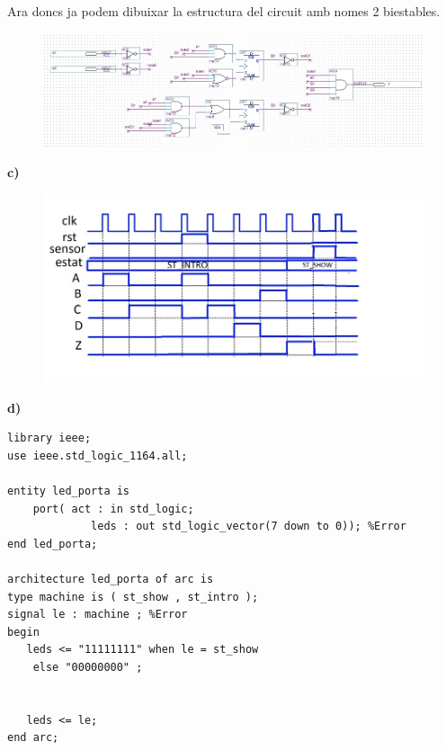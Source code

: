 \documentclass[12pt, a4papre]{article}
\begin{document}
	Ara doncs ja podem dibuixar la estructura del circuit amb nomes 2 biestables.
	
	\begin{figure}[H]
		\begin{center}
		\includegraphics[width=140mm]{DisenyB.jpeg}
		\end{center}
	\end{figure}
	
	\textbf{c)}
	
	\begin{figure}[H]
		\begin{center}
		\includegraphics[width=140mm]{cronogramaC.jpeg}
		\end{center}
	\end{figure}
	
	\textbf{d)}
		\begin{lstlisting}[style=vhdl, frame=single, basicstyle=\small]
library ieee;
use ieee.std_logic_1164.all;

entity led_porta is
    port( act : in std_logic;  
             leds : out std_logic_vector(7 down to 0)); %Error
end led_porta;

architecture led_porta of arc is
type machine is ( st_show , st_intro );
signal le : machine ; %Error 
begin
   leds <= "11111111" when le = st_show
   	else "00000000" ;
   
   
   leds <= le;
end arc;
	\end{lstlisting}
\end{document}
